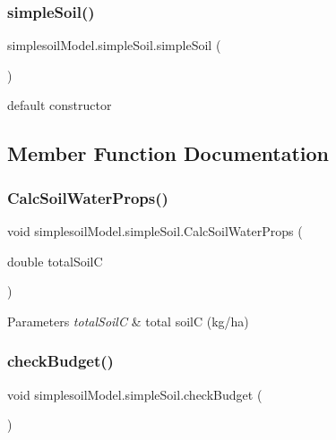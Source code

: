 \subsubsection{\texorpdfstring{simpleSoil()}{simpleSoil()}}
{\footnotesize\ttfamily simplesoil\+Model.\+simple\+Soil.\+simple\+Soil (\begin{DoxyParamCaption}{ }\end{DoxyParamCaption})\hspace{0.3cm}{\ttfamily [inline]}}



default constructor 



\subsection{Member Function Documentation}
\mbox{\label{classsimplesoil_model_1_1simple_soil_ac52b9f1e6b4007ff4b24c8a45816ce74}} 
\subsubsection{\texorpdfstring{CalcSoilWaterProps()}{CalcSoilWaterProps()}}
{\footnotesize\ttfamily void simplesoil\+Model.\+simple\+Soil.\+Calc\+Soil\+Water\+Props (\begin{DoxyParamCaption}\item[{double}]{total\+SoilC }\end{DoxyParamCaption})\hspace{0.3cm}{\ttfamily [inline]}}


\begin{DoxyParams}{Parameters}
{\em total\+SoilC} & total soilC (kg/ha) \\
\hline
\end{DoxyParams}
\mbox{\label{classsimplesoil_model_1_1simple_soil_a40799ba66476c4a190adafc91169699f}} 
\subsubsection{\texorpdfstring{checkBudget()}{checkBudget()}}
{\footnotesize\ttfamily void simplesoil\+Model.\+simple\+Soil.\+check\+Budget (\begin{DoxyParamCaption}{ }\end{DoxyParamCaption})\hspace{0.3cm}{\ttfamily [inline]}}



